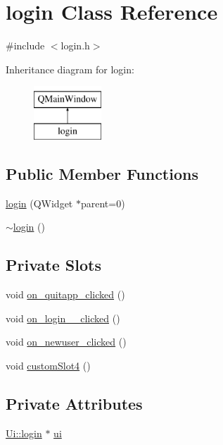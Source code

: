 \hypertarget{classlogin}{\section{login Class Reference}
\label{classlogin}
}


{\ttfamily \#include $<$login.\-h$>$}

Inheritance diagram for login\-:\begin{figure}[H]
\begin{center}
\leavevmode
\includegraphics[height=2.000000cm]{classlogin}
\end{center}
\end{figure}
\subsection*{Public Member Functions}
\begin{DoxyCompactItemize}
\item 
\hyperlink{classlogin_a4bea95f394a7f5709d79b13455881602}{login} (Q\-Widget $\ast$parent=0)
\item 
\hyperlink{classlogin_a4086fe44ad1e40447a0bebbc9b8b3c14}{$\sim$login} ()
\end{DoxyCompactItemize}
\subsection*{Private Slots}
\begin{DoxyCompactItemize}
\item 
void \hyperlink{classlogin_a291f33b883565b354e5f50e525669b89}{on\-\_\-quitapp\-\_\-clicked} ()
\item 
void \hyperlink{classlogin_afd16adab068bff0e384871d3c470a18d}{on\-\_\-login\-\_\-\_\-clicked} ()
\item 
void \hyperlink{classlogin_a613c0e98ffbb6565024ecdc981aa11ef}{on\-\_\-newuser\-\_\-clicked} ()
\item 
void \hyperlink{classlogin_a9e07b1305aa5e0e03bf40e81a82dab17}{custom\-Slot4} ()
\end{DoxyCompactItemize}
\subsection*{Private Attributes}
\begin{DoxyCompactItemize}
\item 
\hyperlink{classUi_1_1login}{Ui\-::login} $\ast$ \hyperlink{classlogin_ab08986017bf8d41e5cbab46dd0492d38}{ui}
\end{DoxyCompactItemize}


